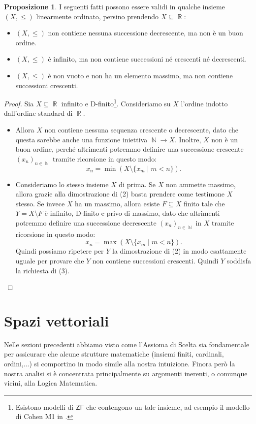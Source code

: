 \documentclass[12pt,a4paper]{report}
\theoremstyle{definition}
\newtheorem{prop}[teo]{Proposizione}  %
\theoremstyle{num.custom-title}
\DeclareMathOperator{\N}{\mathbb{N}}
\DeclareMathOperator{\R}{\mathbb{R}}
\DeclareMathOperator{\sm}{\setminus}
\newcommand{\ZF}{\ensuremath{\mathsf{ZF}}\xspace}
\begin{document}
\begin{prop}
I seguenti fatti possono essere validi in qualche insieme $(X, \leq)$ linearmente ordinato, persino prendendo $X \subseteq \R$:
\begin{itemize}
\item[(1)] $(X, \leq)$ non contiene nessuna successione decrescente, ma non è un buon ordine.
\item[(2)] $(X, \leq)$ è infinito, ma non contiene successioni né crescenti né decrescenti.
\item[(3)] $(X, \leq)$ è non vuoto e non ha un elemento massimo, ma non contiene successioni crescenti.
\end{itemize}
\begin{proof} Sia $X \subseteq \R$ infinito e D-finito\footnote{Esistono modelli di \ZF che contengono un tale insieme, ad esempio il modello di Cohen M1 in \cite{HoRu98:Herrlich}.}. Consideriamo su $X$ l'ordine indotto dall'ordine standard di $\R$.
\begin{itemize}
\item[(1) e (2)] Allora $X$ non contiene nessuna sequenza crescente o decrescente, dato che questa sarebbe anche una funzione iniettiva $\N \to X$. Inoltre, $X$ non è un buon ordine, perché altrimenti potremmo definire una successione crescente $(x_n)_{n \in \N}$ tramite ricorsione in questo modo:
\[
x_n = \min (X \sm \{x_m \mid m<n\}).
\]
\item[(3)] Consideriamo lo stesso insieme $X$ di prima. Se $X$ non ammette massimo, allora grazie alla dimostrazione di (2) basta prendere come testimone $X$ stesso. Se invece $X$ ha un massimo, allora esiste $F \subseteq X$ finito tale che $Y=X \sm F$ è infinito, D-finito e privo di massimo, dato che altrimenti potremmo definire una successione decrescente $(x_n)_{n \in \N}$ in $X$ tramite ricorsione in questo modo:
\[
x_n = \max (X \sm \{x_m \mid m<n\}).
\]
Quindi possiamo ripetere per $Y$ la dimostrazione di (2) in modo esattamente uguale per provare che $Y$ non contiene successioni crescenti. Quindi $Y$ soddisfa la richiesta di (3).
\end{itemize}
\end{proof}
\end{prop}


\section{Spazi vettoriali}

Nelle sezioni precedenti abbiamo visto come l'Assioma di Scelta sia fondamentale per assicurare che alcune strutture matematiche (insiemi finiti, cardinali, ordini,...) si comportino in modo simile alla nostra intuizione. Finora però la nostra analisi si è concentrata principalmente su argomenti inerenti, o comunque vicini, alla Logica Matematica.
\end{document}
